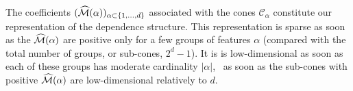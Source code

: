 The coefficients
$(\widehat{\mathcal{M}}(\alpha))_{\alpha\subset\{1,\ldots,d\}}$ associated
  with the cones $\mathcal{C}_\alpha$  constitute our
  representation of the dependence structure.  %
  This representation is sparse as soon as the $\widehat{\mathcal{M}}(\alpha)$  are positive only for a few groups of features $\alpha$
(compared with the total number of groups, or sub-cones,  $2^d - 1$). It
is  is low-dimensional as soon as each of these groups  has moderate
cardinality $|\alpha|$, \ie\ as soon as  the sub-cones  with
positive $\widehat{\mathcal{M}}(\alpha)$ are low-dimensional relatively to $d$.

